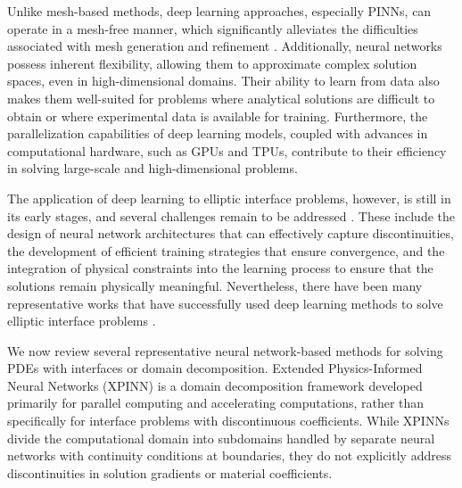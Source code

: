 \documentclass{article}
\begin{document}
Unlike mesh-based methods, deep learning approaches, especially PINNs, can operate in a mesh-free manner, which significantly alleviates the difficulties associated with mesh generation and refinement \cite{cuomo2022scientific, raissi2019physics}. Additionally, neural networks possess inherent flexibility, allowing them to approximate complex solution spaces, even in high-dimensional domains. Their ability to learn from data also makes them well-suited for problems where analytical solutions are difficult to obtain or where experimental data is available for training. Furthermore, the parallelization capabilities of deep learning models, coupled with advances in computational hardware, such as GPUs and TPUs, contribute to their efficiency in solving large-scale and high-dimensional problems.



The application of deep learning to elliptic interface problems, however, is still in its early stages, and several challenges remain to be addressed \cite{cuomo2022scientific}. These include the design of neural network architectures that can effectively capture discontinuities, the development of efficient training strategies that ensure convergence, and the integration of physical constraints into the learning process to ensure that the solutions remain physically meaningful. Nevertheless, there have been many representative works that have successfully used deep learning methods to solve elliptic interface problems \cite{zhang2022multi, sarma2024interface, roy2024adaptive, he2022mesh, hu2022discontinuity, tseng2023cusp, jiang2024generalization, ying2024accurate, li2025local, li2025two, zeng2025high, fan2025novel, zhang2025immersed}.

We now review several representative neural network-based methods for solving PDEs with interfaces or domain decomposition. Extended Physics-Informed Neural Networks (XPINN) \cite{jagtap2020extended} is a domain decomposition framework developed primarily for parallel computing and accelerating computations, rather than specifically for interface problems with discontinuous coefficients. While XPINNs divide the computational domain into subdomains handled by separate neural networks with continuity conditions at boundaries, they do not explicitly address discontinuities in solution gradients or material coefficients.
\end{document}
